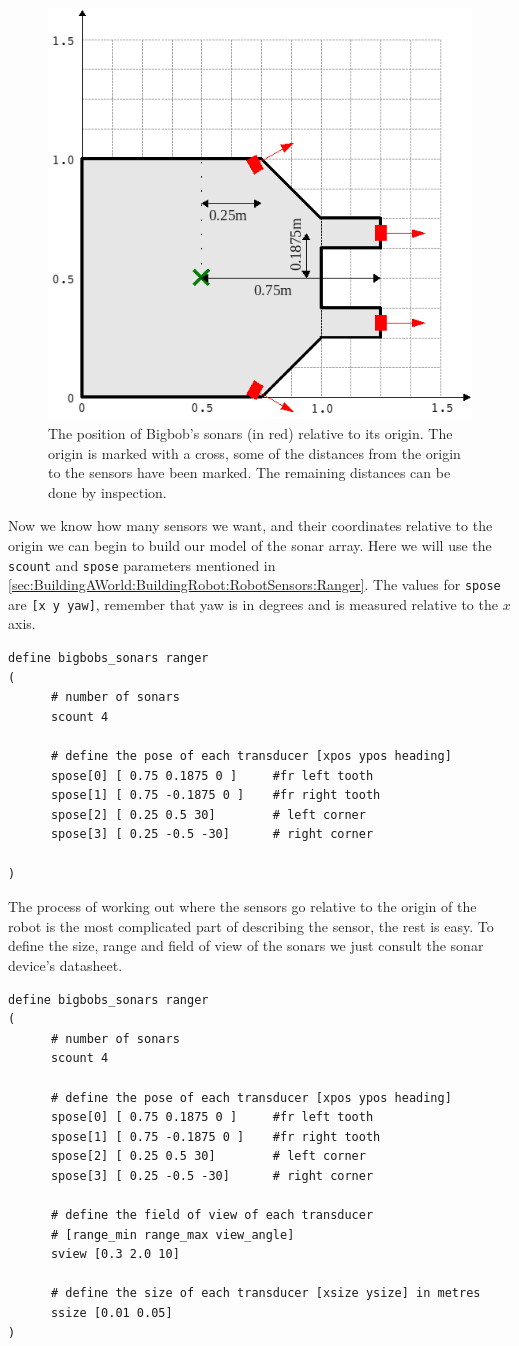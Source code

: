 \documentclass[a4paper]{report}
\begin{document}
\begin{figure}
	\centering
	\includegraphics[width=0.6\linewidth]{./pics/robot_building/bigbob_sonars.png} 
	\caption{The position of Bigbob's sonars (in red) relative to its origin. The origin is marked with a cross, some of the distances from the origin to the sensors have been marked. The remaining distances can be done by inspection.}
	\label{fig:BuildingAWorld:BuildingRobot:RobotSensors:Sonars}
\end{figure}

Now we know how many sensors we want, and their coordinates relative to the origin we can begin to build our model of the sonar array. Here we will use the \verb|scount| and \verb|spose| parameters mentioned in \ref{sec:BuildingAWorld:BuildingRobot:RobotSensors:Ranger}. The values for \verb|spose| are \verb|[x y yaw]|, remember that yaw is in degrees and is measured relative to the $x$ axis.
\begin{verbatim}
define bigbobs_sonars ranger
(
      # number of sonars
      scount 4

      # define the pose of each transducer [xpos ypos heading]
      spose[0] [ 0.75 0.1875 0 ]     #fr left tooth
      spose[1] [ 0.75 -0.1875 0 ]    #fr right tooth
      spose[2] [ 0.25 0.5 30]        # left corner
      spose[3] [ 0.25 -0.5 -30]      # right corner

)
\end{verbatim}

The process of working out where the sensors go relative to the origin of the robot is the most complicated part of describing the sensor, the rest is easy. To define the size, range and field of view of the sonars we just consult the sonar device's datasheet.
\begin{verbatim}
define bigbobs_sonars ranger
(
      # number of sonars
      scount 4

      # define the pose of each transducer [xpos ypos heading]
      spose[0] [ 0.75 0.1875 0 ]     #fr left tooth
      spose[1] [ 0.75 -0.1875 0 ]    #fr right tooth
      spose[2] [ 0.25 0.5 30]        # left corner
      spose[3] [ 0.25 -0.5 -30]      # right corner
      
      # define the field of view of each transducer 
      # [range_min range_max view_angle]
      sview [0.3 2.0 10]

      # define the size of each transducer [xsize ysize] in metres
      ssize [0.01 0.05]
)
\end{verbatim}
\end{document}
